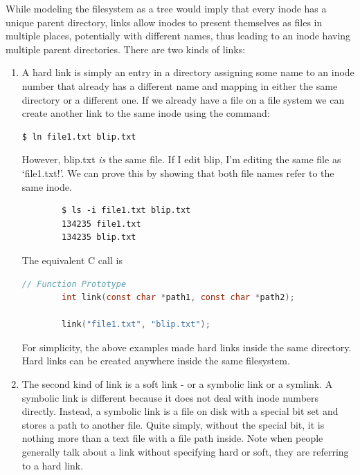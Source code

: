 While modeling the filesystem as a tree would imply that every inode has a unique parent directory, links allow inodes to present themselves as files in multiple places, potentially with different names, thus leading to an inode having multiple parent directories.
There are two kinds of links:

\begin{enumerate}
    \item {}
        A hard link is simply an entry in a directory assigning some name to an inode number that already has a different name and mapping in either the same directory or a different one.
        If we already have a file on a file system we can create another link to the same inode using the  command:

        \begin{lstlisting}[language=bash]
            $ ln file1.txt blip.txt
        \end{lstlisting}

        However, blip.txt \emph{is} the same file.
        If I edit blip, I'm editing the same file as `file1.txt!'.
        We can prove this by showing that both file names refer to the same inode.

        \begin{verbatim}
        $ ls -i file1.txt blip.txt
        134235 file1.txt
        134235 blip.txt
        \end{verbatim}

        The equivalent C call is 

        \begin{lstlisting}[language=C]
        // Function Prototype
        int link(const char *path1, const char *path2);

        link("file1.txt", "blip.txt");
        \end{lstlisting}

        For simplicity, the above examples made hard links inside the same directory.
        Hard links can be created anywhere inside the same filesystem.

    \item {}
        The second kind of link is a soft link - or a symbolic link or a symlink.
        A symbolic link is different because it does not deal with inode numbers directly.
        Instead, a symbolic link is a file on disk with a special bit set and stores a path to another file.
        Quite simply, without the special bit, it is nothing more than a text file with a file path inside.
        Note when people generally talk about a link without specifying hard or soft, they are referring to a hard link.


\end{enumerate}
